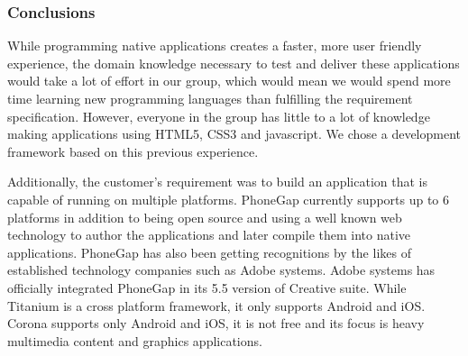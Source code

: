 \subsubsection{Conclusions}
While programming native applications creates a faster, more user friendly experience, the domain knowledge necessary to test and deliver these applications would take a lot of effort in our group, which would mean we would spend more time learning new programming languages than fulfilling the requirement specification. However, everyone in the group has little to a lot of knowledge making applications using HTML5, CSS3 and javascript. We chose a development framework based on this previous experience.

Additionally, the customer's requirement was to build an application that is capable of running on multiple platforms. PhoneGap currently supports up to 6 platforms in addition to being open source and using a well known web technology to author the applications and later compile them into native applications. PhoneGap has also been getting recognitions by the likes of established technology companies such as Adobe systems.  Adobe systems has officially integrated PhoneGap in its 5.5 version of Creative suite. While Titanium is a cross platform framework, it only supports Android and iOS. Corona supports only Android and iOS, it is not free and its focus is heavy multimedia content and graphics applications.

